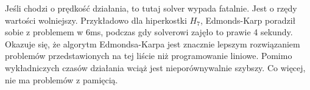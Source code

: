 \documentclass{article}
\begin{document}
Jeśli chodzi o prędkość działania, to tutaj solver wypada fatalnie.
Jest o rzędy wartości wolniejszy.
Przykładowo dla hiperkostki $H_7$, Edmonds-Karp poradził sobie z problemem w 6ms, podczas gdy solverowi zajęło to prawie 4 sekundy.\\


Okazuje się, że algorytm Edmondsa-Karpa jest znacznie lepszym rozwiązaniem problemów przedstawionych na tej liście niż programowanie liniowe.
Pomimo wykładniczych czasów działania wciąż jest nieporównywalnie szybszy. Co więcej, nie ma problemów z pamięcią.
\end{document}
